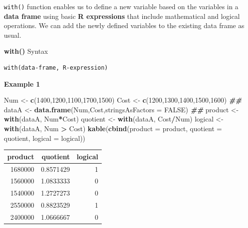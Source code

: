 \documentclass[
]{book}
\newenvironment{Shaded}{\begin{snugshade}}{\end{snugshade}}
\newcommand{\AttributeTok}[1]{\textcolor[rgb]{0.13,0.29,0.53}{#1}}
\newcommand{\ConstantTok}[1]{\textcolor[rgb]{0.56,0.35,0.01}{#1}}
\newcommand{\DecValTok}[1]{\textcolor[rgb]{0.00,0.00,0.81}{#1}}
\newcommand{\DocumentationTok}[1]{\textcolor[rgb]{0.56,0.35,0.01}{\textbf{\textit{#1}}}}
\newcommand{\FunctionTok}[1]{\textcolor[rgb]{0.13,0.29,0.53}{\textbf{#1}}}
\newcommand{\NormalTok}[1]{#1}
\newcommand{\OtherTok}[1]{\textcolor[rgb]{0.56,0.35,0.01}{#1}}
\newcommand{\SpecialCharTok}[1]{\textcolor[rgb]{0.81,0.36,0.00}{\textbf{#1}}}
\begin{document}
\texttt{with()} function enables us to define a new variable based on the variables in a \textbf{data frame} using basic \textbf{R expressions} that include mathematical and logical operations. We can add the newly defined variables to the existing data frame as usual.

\textbf{with()} Syntax

\begin{verbatim}
with(data-frame, R-expression)
\end{verbatim}

\textbf{Example 1}

\begin{Shaded}
\begin{Highlighting}[]
\NormalTok{Num }\OtherTok{\textless{}{-}} \FunctionTok{c}\NormalTok{(}\DecValTok{1400}\NormalTok{,}\DecValTok{1200}\NormalTok{,}\DecValTok{1100}\NormalTok{,}\DecValTok{1700}\NormalTok{,}\DecValTok{1500}\NormalTok{)}
\NormalTok{Cost }\OtherTok{\textless{}{-}} \FunctionTok{c}\NormalTok{(}\DecValTok{1200}\NormalTok{,}\DecValTok{1300}\NormalTok{,}\DecValTok{1400}\NormalTok{,}\DecValTok{1500}\NormalTok{,}\DecValTok{1600}\NormalTok{)}
\DocumentationTok{\#\#}
\NormalTok{dataA }\OtherTok{\textless{}{-}} \FunctionTok{data.frame}\NormalTok{(Num,Cost,}\AttributeTok{stringsAsFactors =} \ConstantTok{FALSE}\NormalTok{)}
\DocumentationTok{\#\#}
\NormalTok{product }\OtherTok{\textless{}{-}} \FunctionTok{with}\NormalTok{(dataA, Num}\SpecialCharTok{*}\NormalTok{Cost)}
\NormalTok{quotient }\OtherTok{\textless{}{-}} \FunctionTok{with}\NormalTok{(dataA, Cost}\SpecialCharTok{/}\NormalTok{Num)}
\NormalTok{logical }\OtherTok{\textless{}{-}} \FunctionTok{with}\NormalTok{(dataA, Num }\SpecialCharTok{\textgreater{}}\NormalTok{ Cost)}
\FunctionTok{kable}\NormalTok{(}\FunctionTok{cbind}\NormalTok{(}\AttributeTok{product =}\NormalTok{ product, }\AttributeTok{quotient =}\NormalTok{ quotient, }\AttributeTok{logical =}\NormalTok{ logical))}
\end{Highlighting}
\end{Shaded}

\begin{tabular}{r|r|r}
\hline
product & quotient & logical\\
\hline
1680000 & 0.8571429 & 1\\
\hline
1560000 & 1.0833333 & 0\\
\hline
1540000 & 1.2727273 & 0\\
\hline
2550000 & 0.8823529 & 1\\
\hline
2400000 & 1.0666667 & 0\\
\hline
\end{tabular}
\end{document}
